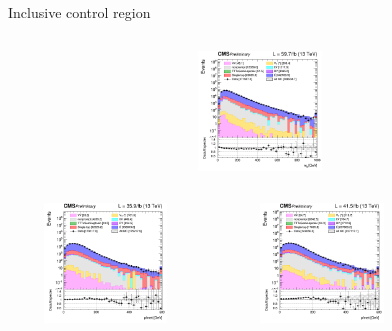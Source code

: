 \documentclass[8pt]{beamer}
\begin{document}
\begin{frame}{Inclusive control region}
\begin{columns}
\begin{column}{0.33\textwidth}
\begin{center}
			\begin{block}{}\end{block}\vspace{10pt}
     			\includegraphics[width=1.0\textwidth, height=90pt]{figs/2018/log_cratio_inclusiveCR_df_mll.png}
    		\end{center}		
		\end{column}
\end{columns}
\begin{columns}
		\begin{column}{0.33\textwidth}
			\begin{center}
     			\includegraphics[width=1.0\textwidth, height=90pt]{figs/2016/log_cratio_inclusiveCR_df_METcorrected_pt.png}
    		\end{center}		
		\end{column}
		\begin{column}{0.33\textwidth}
			\begin{center}
     			\includegraphics[width=1.0\textwidth, height=90pt]{figs/2017/log_cratio_inclusiveCR_df_METcorrected_pt.png}
    		\end{center}		
		\end{column}
		\begin{column}{0.33\textwidth}

\end{column}
\end{columns}
\end{frame}
\end{document}
